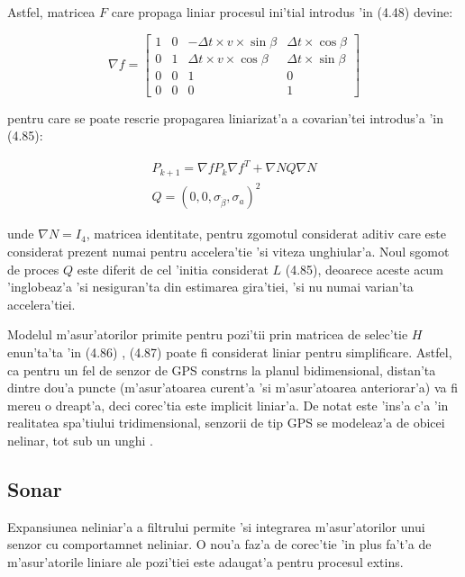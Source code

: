 \documentclass[12pt,a4paper,twoside]{report}
\begin{document}
Astfel, matricea $F$ care propaga liniar procesul ini'tial introdus 'in (4.48) devine:

\begin{equation}
    \nabla f =  \begin{bmatrix} 1 & 0 & - \Delta t \times v \times \sin{\beta} & \Delta t \times \cos{\beta}  \\ 0 & 1 & \Delta t \times v \times \cos{\beta} & \Delta t \times \sin {\beta}\\ 0 & 0 & 1 & 0 \\ 0 & 0 & 0 & 1\end{bmatrix}
\end{equation}

pentru care se poate rescrie propagarea liniarizat'a a covarian'tei introdus'a 'in (4.85):

\begin{gather}
    P_{k+1} = \nabla f P_k {\nabla f}^T + \nabla N Q \nabla N \\
    Q = {(0,0, \sigma_{\dot \beta}, \sigma_a)}^2
\end{gather}

unde $ \nabla N = I_4 $, matricea identitate, pentru zgomotul considerat aditiv care este considerat prezent numai pentru accelera'tie 'si viteza unghiular'a. Noul sgomot de proces $Q$
este diferit de cel 'initia considerat $L$ (4.85), deoarece aceste acum 'inglobeaz'a 'si nesiguran'ta din estimarea gira'tiei, 'si nu numai varian'ta accelera'tiei.

\vspace{5px}

Modelul m'asur'atorilor primite pentru pozi'tii prin matricea de selec'tie $H$ enun'ta'ta 'in (4.86) , (4.87) poate fi considerat liniar pentru simplificare. Astfel, ca pentru un fel de senzor de GPS constr\ia ns la planul bidimensional, distan'ta dintre dou'a puncte (m'asur'atoarea curent'a 'si m'asur'atoarea anteriorar'a) va fi mereu o dreapt'a, deci corec'tia este implicit liniar'a. De notat este 'ins'a c'a 'in realitatea spa'tiului tridimensional, senzorii de tip GPS se modeleaz'a de obicei nelinar, tot sub un unghi \cite{Qi19982AD}.

\subsection{Sonar}

Expansiunea neliniar'a a filtrului permite 'si integrarea m'asur'atorilor unui senzor cu comportamnet neliniar. O nou'a faz'a de corec'tie 'in plus fa't'a de m'asur'atorile liniare ale pozi'tiei este adaugat'a pentru procesul extins. 
\end{document}
